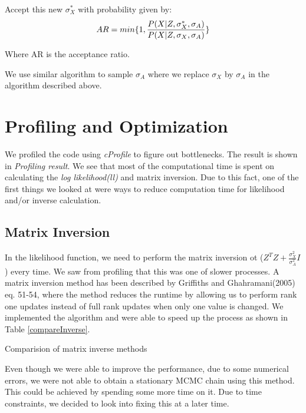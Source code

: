 \documentclass{article}
\begin{document}
Accept this new $\sigma_X^{*}$ with probability given by:
\begin{equation}
AR = min\{1,\frac{P(X|Z, \sigma_X^{*}, \sigma_A)}{P(X|Z, \sigma_X,\sigma_A)}\}\\
\end{equation}

Where AR is the acceptance ratio.

We use similar algorithm to sample $\sigma_A$ where we replace $\sigma_X$ by $\sigma_A$ in the algorithm described above.



\section{Profiling and Optimization}
We profiled the code using \textit{cProfile} to figure out bottlenecks. The result is shown in \textit{Profiling result}. We see that most of the computational time is spent on calculating the \textit{log likelihood(ll)}  and matrix inversion. Due to this fact, one of the first things we looked at were ways to reduce computation time for likelihood and/or inverse calculation.\\


\subsection{Matrix Inversion}
In the likelihood function, we need to perform the matrix inversion ot ($Z^TZ+\frac{\sigma_X^2}{\sigma_A^2}I$) every time. We saw from profiling that this was one of slower processes. A matrix inversion method has been described by Griffiths and Ghahramani(2005)~\cite{griffiths1} eq. 51-54, where the method reduces the runtime by allowing us to perform rank one updates instead of full rank updates when only one value is changed. We implemented the algorithm and were able to speed up the process as shown in Table \ref{compareInverse}.

\begin{table}[ht]
\centering
\caption{Comparision of matrix inverse methods \label{compareInverse}}

\end{table}

Even though we were able to improve the performance, due to some numerical errors, we were not able to obtain a stationary MCMC chain using this method. This could be achieved by spending some more time on it. Due to time constraints, we decided to look into fixing this at a later time.\\
\end{document}
